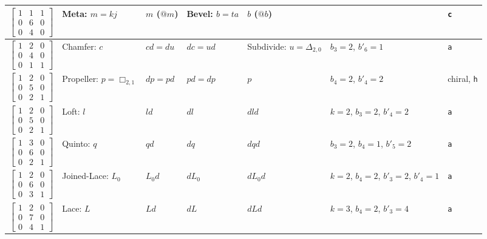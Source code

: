 \documentclass{amsart}[12pt]
\begin{document}
\begin{longtable}{c|m{2cm}|m{2cm}|m{2cm}|m{2cm}|m{1.7cm}|m{2.5cm}}
    $\begin{bmatrix}
    1 & 1 & 1 \\
    0 & 6 & 0 \\
    0 & 4 & 0 \end{bmatrix}$& Meta: ${m=kj}$ & $m$ ($@m$) & Bevel: ${b=ta}$ & $b$ ($@b$) & &\texttt{c}
    \\ \hline
    $\begin{bmatrix}
    1 & 2 & 0 \\
    0 & 4 & 0 \\
    0 & 1 & 1 \end{bmatrix}$& Chamfer: $c$ & $cd=du$ & $dc=ud$ & Subdivide: ${u =\Delta_{2,0}}$ & ${b_3=2}$, ${b'_6=1}$ &\texttt{a}
    \\ \hline
    $\begin{bmatrix}
    1 & 2 & 0 \\
    0 & 5 & 0 \\
    0 & 2 & 1 \end{bmatrix}$& Propeller: ${p=\Box_{2,1}}$ & $dp=pd$ & $pd=dp$ & $p$ & ${b_4=2}$, ${b'_4=2}$ &chiral, \texttt{h}
    \\ \hline
    $\begin{bmatrix}
    1 & 2 & 0 \\
    0 & 5 & 0 \\
    0 & 2 & 1 \end{bmatrix}$& Loft: $l$ & $ld$ & $dl$ & $dld$ & ${k=2}$, ${b_3=2}$, ${b'_4=2}$ &\texttt{a}
    \\ \hline
    $\begin{bmatrix}
    1 & 3 & 0 \\
    0 & 6 & 0 \\
    0 & 2 & 1 \end{bmatrix}$& Quinto: $q$ & $qd$ & $dq$ & $dqd$ & ${b_3=2}$, ${b_4=1}$, ${b'_5=2}$ &\texttt{a}
    \\ \hline
    $\begin{bmatrix}
    1 & 2 & 0 \\
    0 & 6 & 0 \\
    0 & 3 & 1 \end{bmatrix}$& Joined-Lace: $L_0$ & $L_0d$ & $dL_0$ & $dL_0d$
    & ${k=2}$, ${b_4=2}$, ${b'_3=2}$, ${b'_4=1}$ &\texttt{a}
    \\ \hline
    $\begin{bmatrix}
    1 & 2 & 0 \\
    0 & 7 & 0 \\
    0 & 4 & 1 \end{bmatrix}$& Lace: $L$ & $Ld$ & $dL$ & $dLd$ & ${k=3}$, ${b_4=2}$, ${b'_3=4}$&\texttt{a}

\end{longtable}
\end{document}
